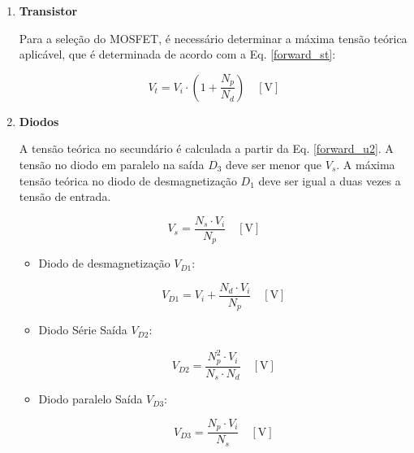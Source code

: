 \begin{apendicesenv}
\begin{enumerate}
\item \textbf{Transistor}

Para a seleção do MOSFET, é necessário determinar a máxima tensão teórica aplicável, que é determinada de acordo com a Eq. \ref{forward_st}: 
    
    \begin{equation}
        V_{t} = V_{i} \cdot \left( 1 + \frac{N_{p}}{N_{d}} \right) \quad [\text{V}]
        \label{forward_st}
    \end{equation}

\item \textbf{Diodos}

A tensão teórica no secundário é calculada a partir da Eq. \ref{forward_u2}. A tensão no diodo em paralelo na saída $D_{3}$ deve ser menor que $V_{s}$. A máxima tensão teórica no diodo de desmagnetização $D_{1}$ deve ser igual a duas vezes a tensão de entrada. 


\begin{equation}
        V_{s} = \frac{N_{s} \cdot V_{i}}{N_{p}} \quad [\text{V}]
        \label{forward_u2}
    \end{equation}


\begin{itemize}

    \item Diodo de desmagnetização $V_{D1}$:
    
    \begin{equation}
        V_{D1} = V_{i} + \frac{N_{d} \cdot V_{i}}{N_{p}} \quad [\text{V}]
    \end{equation}

    \item Diodo Série Saída $V_{D2}$: 
    
    \begin{equation}
        V_{D2} = \frac{N_{p}^{2} \cdot V_{i}}{N_{s} \cdot N_{d}} \quad [\text{V}]
    \end{equation}
    
    \item Diodo paralelo Saída $V_{D3}$:
    
    \begin{equation}
        V_{D3} = \frac{N_{p} \cdot V_{i}}{N_{s}} \quad [\text{V}]
    \end{equation}
    

\end{itemize}
\end{enumerate}
\end{apendicesenv}
